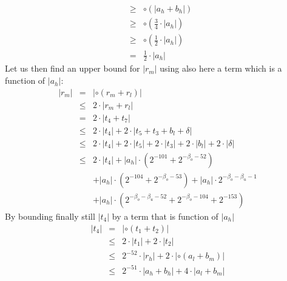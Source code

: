 \documentclass[a4paper,10pt,twoside]{article}
\newenvironment{proof}[1][Proof]{\begin{trivlist}
\item[\hskip \labelsep {\bfseries #1}]}{\end{trivlist}}
\newcommand{\hi}{\ensuremath{\mathit{h}}}
\newcommand{\mi}{\ensuremath{\mathit{m}}}
\newcommand{\lo}{\ensuremath{\mathit{l}}}
\begin{document}
\begin{proof}
\begin{eqnarray*}
& \geq & \circ \left( \left \vert a_\hi + b_\hi \right \vert \right) \\
& \geq & \circ \left( \frac{3}{4} \cdot \left \vert a_\hi \right \vert \right) \\
& \geq & \circ \left( \frac{1}{2} \cdot \left \vert a_\hi \right \vert \right) \\
& = & \frac{1}{2} \cdot \left \vert a_\hi \right \vert 
\end{eqnarray*}
Let us then find an upper bound for $\left \vert r_\mi \right \vert$ 
using also here a term which is a function of $\left \vert a_\hi \right \vert$:
\begin{eqnarray*}
\left \vert r_\mi \right \vert & = & \left \vert \circ \left( r_\mi + r_\lo \right) \right \vert \\
& \leq & 2 \cdot \left \vert r_\mi + r_\lo \right \vert \\
& = & 2 \cdot \left \vert t_4 + t_7 \right \vert \\
& \leq & 2 \cdot \left \vert t_4 \right \vert + 2 \cdot \left \vert t_5 + t_3 + b_\lo + \delta \right \vert \\
& \leq & 2 \cdot \left \vert t_4 \right \vert + 2 \cdot \left \vert t_5 \right \vert + 
2 \cdot  \left \vert t_3 \right \vert + 2 \cdot \left \vert b_\lo \right \vert + 2 \cdot \left \vert \delta \right \vert \\
& \leq & 2 \cdot \left \vert t_4 \right \vert + \left \vert a_\hi \right \vert \cdot \left( 2^{-101} + 2^{-\beta_o-52} \right) \\
& & + \left \vert a_\hi \right \vert \cdot \left( 2^{-104} + 2^{-\beta_o-53} \right) +
\left \vert a_\hi \right \vert \cdot 2^{-\beta_o-\beta_u-1} \\
& & +
\left \vert a_\hi \right \vert \cdot \left( 2^{-\beta_o-\beta_u-52} + 2^{-\beta_o-104} + 2^{-153}\right) 
\end{eqnarray*}
By bounding finally still $\left \vert t_4 \right \vert$ by a term that is function of $\left \vert a_\hi \right \vert$
\begin{eqnarray*}
\left \vert t_4 \right \vert & = & \left \vert \circ \left( t_1 + t_2 \right) \right \vert \\
& \leq & 2 \cdot \left \vert t_1 \right \vert + 2 \cdot \left \vert t_2 \right \vert \\
& \leq & 2^{-52} \cdot \left \vert r_\hi \right \vert + 2 \cdot \left \vert \circ \left( a_\lo + b_\mi \right) \right \vert \\
& \leq & 2^{-51} \cdot \left \vert a_\hi + b_\hi \right \vert + 4 \cdot \left \vert a_\lo + b_\mi \right \vert \\

\end{eqnarray*}
\end{proof}
\end{document}
